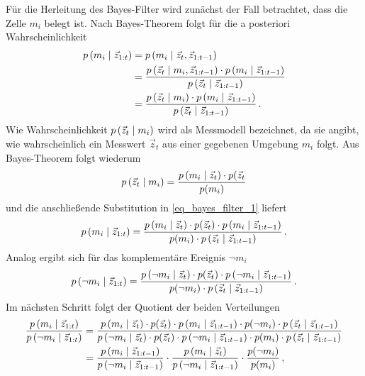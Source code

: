 Für die Herleitung des Bayes-Filter wird zunächst der Fall betrachtet, dass die Zelle $m_i$ belegt ist. Nach Bayes-Theorem folgt für die a posteriori Wahrscheinlichkeit
\begin{equation}
\label{eq_bayes_filter_1}
\begin{split}
\condP{m_i}{\vec{z}_{1:t}} &= \condP{m_i}{\vec{z}_t, \vec{z}_{1:t-1}} \\
&= \frac{\condP{\vec{z}_t}{m_i, \vec{z}_{1:t-1}}\cdot \condP{m_i}{\vec{z}_{1:t-1}}}{\condP{\vec{z}_t}{\vec{z}_{1:t-1}}} \\
&= \frac{\condP{\vec{z}_t}{m_i}\cdot \condP{m_i}{\vec{z}_{1:t-1}}}{\condP{\vec{z}_t}{\vec{z}_{1:t-1}}}\,.
\end{split}
\end{equation}
Wie Wahrscheinlichkeit $p\left({\vec{z}_t} \hspace{1mm} \vert \hspace{1mm} {m_i}\right)$ wird als Messmodell bezeichnet, da sie angibt, wie wahrscheinlich ein Messwert $\vec{z}_t$ aus einer gegebenen Umgebung $m_i$ folgt. Aus Bayes-Theorem folgt wiederum
\begin{equation}
p\left({\vec{z}_t} \hspace{1mm} \vert \hspace{1mm} {m_i}\right) = \frac{p\left({m_i} \hspace{1mm} \vert \hspace{1mm} {\vec{z}_t}\right)\cdot p(\vec{z}_t}{p(m_i)}
\end{equation}
und die anschließende Substitution in \ref{eq_bayes_filter_1} liefert
\begin{equation}
p\left({m_i} \hspace{1mm} \vert \hspace{1mm} {\vec{z}_{1:t}}\right) = \frac{p\left({m_i} \hspace{1mm} \vert \hspace{1mm} {\vec{z}_t}\right)\cdot p(\vec{z}_t) \cdot p\left({m_i} \hspace{1mm} \vert \hspace{1mm} {\vec{z}_{1:t-1}}\right)}{p(m_i)\cdot p\left({\vec{z}_t} \hspace{1mm} \vert \hspace{1mm} {\vec{z}_{1:t-1}}\right)}\,.
\end{equation}
Analog ergibt sich für das komplementäre Ereignis $\neg m_i$
\begin{equation}
p\left({\neg m_i} \hspace{1mm} \vert \hspace{1mm} {\vec{z}_{1:t}}\right) = \frac{p\left({\neg m_i} \hspace{1mm} \vert \hspace{1mm} {\vec{z}_t}\right)\cdot p(\vec{z}_t) \cdot p\left({\neg m_i} \hspace{1mm} \vert \hspace{1mm} {\vec{z}_{1:t-1}}\right)}{p(\neg m_i)\cdot p\left({\vec{z}_t} \hspace{1mm} \vert \hspace{1mm} {\vec{z}_{1:t-1}}\right)}\,.
\end{equation}
Im nächsten Schritt folgt der Quotient der beiden Verteilungen
\begin{equation}
\begin{split}
\frac{p\left({m_i} \hspace{1mm} \vert \hspace{1mm} {\vec{z}_{1:t}}\right)}{p\left({\neg m_i} \hspace{1mm} \vert \hspace{1mm} {\vec{z}_{1:t}}\right)} &= \frac{p\left({m_i} \hspace{1mm} \vert \hspace{1mm} {\vec{z}_t}\right)\cdot p(\vec{z}_t) \cdot p\left({m_i} \hspace{1mm} \vert \hspace{1mm} {\vec{z}_{1:t-1}}\right) \cdot p(\neg m_i)\cdot p\left({\vec{z}_t} \hspace{1mm} \vert \hspace{1mm} {\vec{z}_{1:t-1}}\right)}{p\left({\neg m_i} \hspace{1mm} \vert \hspace{1mm} {\vec{z}_t}\right)\cdot p(\vec{z}_t) \cdot p\left({\neg m_i} \hspace{1mm} \vert \hspace{1mm} {\vec{z}_{1:t-1}}\right) \cdot p(m_i)\cdot p\left({\vec{z}_t} \hspace{1mm} \vert \hspace{1mm} {\vec{z}_{1:t-1}}\right)} \\
&= \frac{p\left({m_i} \hspace{1mm} \vert \hspace{1mm} {\vec{z}_{1:t-1}}\right)}{p\left({\neg m_i} \hspace{1mm} \vert \hspace{1mm} {\vec{z}_{1:t-1}}\right)} \cdot
\frac{p\left({m_i} \hspace{1mm} \vert \hspace{1mm} {\vec{z}_t}\right)}{p\left({\neg m_i} \hspace{1mm} \vert \hspace{1mm} {\vec{z}_{1:t-1}}\right)}\cdot \frac{p(\neg m_i)}{p(m_i)}\,,
\end{split}
\end{equation}
